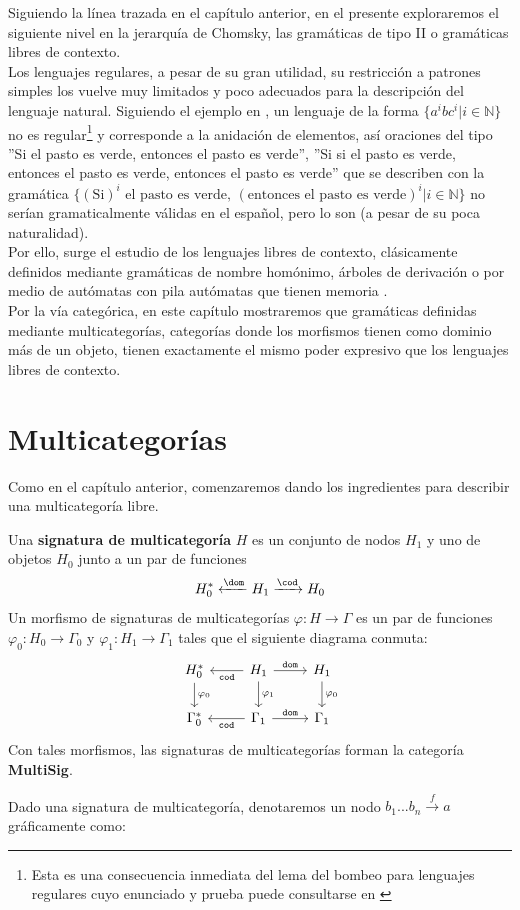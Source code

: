 \documentclass[../main.tex]{subfiles}
\begin{document}
	
Siguiendo la línea trazada en el capítulo anterior, en el presente exploraremos el siguiente nivel en la jerarquía de Chomsky, las gramáticas de tipo II o gramáticas libres de contexto. \\
Los lenguajes regulares, a pesar de su gran utilidad, su restricción a patrones simples los vuelve muy limitados y poco adecuados para la descripción del lenguaje natural. Siguiendo el ejemplo en \cite{Kulacka2012}, un lenguaje de la forma $\{ a^i b c^i|i \in \mathbb{N} \}$ no es regular\footnote{Esta es una consecuencia inmediata del lema del bombeo para lenguajes regulares cuyo enunciado y prueba puede consultarse en \cite{hopcroft01}} y corresponde a la anidación de elementos, así oraciones del tipo ''Si el pasto es verde, entonces el pasto es verde'', ''Si si el pasto es verde, entonces el pasto es verde, entonces el pasto es verde'' que se describen con la gramática $\{ (\text{Si})^i \text{ el pasto es verde, } (\text{entonces el pasto es verde})^i | i \in \mathbb{N}\}$ no serían gramaticalmente válidas en el español, pero lo son (a pesar de su
poca naturalidad). \\
Por ello, surge  el estudio de los lenguajes libres de contexto, clásicamente definidos mediante gramáticas de nombre homónimo, árboles de derivación o por medio de autómatas con pila \textemdash autómatas que tienen memoria \textemdash. \\
Por la vía categórica, en este capítulo mostraremos que gramáticas definidas mediante multicategorías, categorías donde los morfismos tienen como dominio más de un objeto, tienen exactamente el mismo poder expresivo que los lenguajes libres de contexto. 

\section{Multicategorías}

Como en el capítulo anterior, comenzaremos dando los ingredientes para describir una multicategoría libre. 

\begin{dfn}
	Una \textbf{signatura de multicategoría} $H$ es un conjunto de nodos $H_1$ y uno de objetos \(H_0\) junto a un par de funciones
	\[
		H_0^* \xleftarrow{\dom} H_1 \xrightarrow{\cod} H_0
	\] 
	Un morfismo de signaturas de multicategorías $\varphi : H \to \Gamma$ es un par de funciones $\varphi_0 : H_0 \to \Gamma_0$ y $\varphi_1 : H_1 \to \Gamma_1$ tales que el siguiente diagrama conmuta: 
	\[
	\begin{tikzcd}
		H_0^* \arrow{d}{\phi_0} & H_1 \arrow{r}{\tt{dom}} \arrow{l}{\tt{cod}} \arrow{d}{\phi_1} & H_1 \arrow{d}{\phi_0} \\
		\Gamma_0^* & \Gamma_1 \arrow{r}{\tt{dom}} \arrow{l}{\tt{cod}} & \Gamma_1
	\end{tikzcd}
	\]
	Con tales morfismos, las signaturas de multicategorías forman la categoría \textbf{MultiSig}.
\end{dfn}
\noindent Dado una signatura de multicategoría, denotaremos un nodo $b_1...b_n \xrightarrow{f} a$ gráficamente como: 
	
\end{document}

